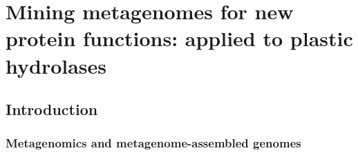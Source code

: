

\chapter{Mining metagenomes for new protein functions: applied to plastic hydrolases}
\label{chapter:metagenomes}



\section{Introduction}

\subsection{Metagenomics and metagenome-assembled genomes}

